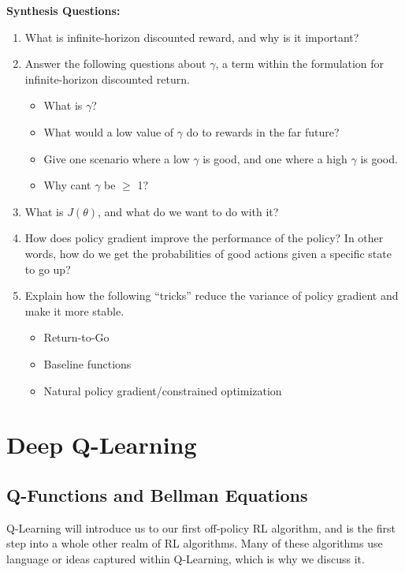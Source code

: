 \begin{questionbox}
\textbf{Synthesis Questions:}
\begin{enumerate}
    \item What is infinite-horizon discounted reward, and why is it important?
    \item Answer the following questions about $\gamma$, a term within the formulation for infinite-horizon discounted return.
    \begin{itemize}
        \item What is $\gamma$?
        \item What would a low value of $\gamma$ do to rewards in the far future?
        \item Give one scenario where a low $\gamma$ is good, and one where a high $\gamma$ is good.
        \item Why cant $\gamma$ be $\geq$ 1?
    \end{itemize}
    \item What is $J(\theta)$, and what do we want to do with it?
    \item How does policy gradient improve the performance of the policy? In other words, how do we get the probabilities of good actions given a specific state to go up?
    \item Explain how the following ``tricks'' reduce the variance of policy gradient and make it more stable.
    \begin{itemize}
        \item Return-to-Go
        \item Baseline functions
        \item Natural policy gradient/constrained optimization
    \end{itemize}
\end{enumerate}
\end{questionbox}


\section{Deep Q-Learning}
\subsection{Q-Functions and Bellman Equations}
    \large Q-Learning will introduce us to our first off-policy RL algorithm, and is the first step into a whole other realm of RL algorithms. Many of these algorithms use language or ideas captured within Q-Learning, which is why we discuss it. 

